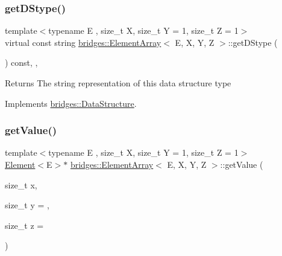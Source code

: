 \subsubsection{\texorpdfstring{get\+D\+Stype()}{getDStype()}}
{\footnotesize\ttfamily template$<$typename E , size\+\_\+t X, size\+\_\+t Y = 1, size\+\_\+t Z = 1$>$ \\
virtual const string \mbox{\hyperlink{classbridges_1_1_element_array}{bridges\+::\+Element\+Array}}$<$ E, X, Y, Z $>$\+::get\+D\+Stype (\begin{DoxyParamCaption}{ }\end{DoxyParamCaption}) const\hspace{0.3cm}{\ttfamily [inline]}, {\ttfamily [override]}, {\ttfamily [virtual]}}

\begin{DoxyReturn}{Returns}
The string representation of this data structure type 
\end{DoxyReturn}


Implements \mbox{\hyperlink{classbridges_1_1_data_structure_a957a63b106e340bc753620c650632bdc}{bridges\+::\+Data\+Structure}}.

\mbox{\label{classbridges_1_1_element_array_a45bac55f6f64a90eb61fd3faaf1aaffe}} 
\subsubsection{\texorpdfstring{get\+Value()}{getValue()}\hspace{0.1cm}{\footnotesize\ttfamily [1/2]}}
{\footnotesize\ttfamily template$<$typename E , size\+\_\+t X, size\+\_\+t Y = 1, size\+\_\+t Z = 1$>$ \\
\mbox{\hyperlink{classbridges_1_1_element}{Element}}$<$E$>$$\ast$ \mbox{\hyperlink{classbridges_1_1_element_array}{bridges\+::\+Element\+Array}}$<$ E, X, Y, Z $>$\+::get\+Value (\begin{DoxyParamCaption}\item[{size\+\_\+t}]{x,  }\item[{size\+\_\+t}]{y = {},  }\item[{size\+\_\+t}]{z = {} }\end{DoxyParamCaption})\hspace{0.3cm}{\ttfamily [inline]}}

